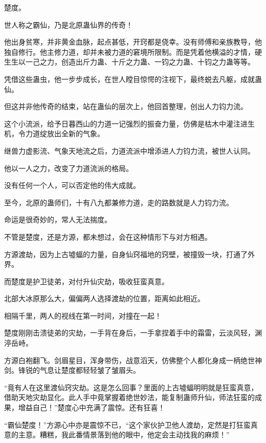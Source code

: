 
\begin{this_body}

楚度。

世人称之霸仙，乃是北原蛊仙界的传奇！

他出身贫寒，并非黄金血脉，起点甚低，开窍都是侥幸。没有师傅和亲族教导，他独自修行。他主修力道，却并未被力道的窘境所限制。而是凭着他横溢的才情，硬生生以一己之力，创造出斤力蛊、十斤之力蛊、一钧之力蛊、十钧之力蛊等等。

凭借这些蛊虫，他一步步成长，在世人瞠目惊愕的注视下，最终蜕去凡躯，成就蛊仙。

但这并非他传奇的结束，站在蛊仙的层次上，他回首整理，创出人力钧力流。

这个小流派，给予日暮西山的力道一记强烈的振奋力量，仿佛是枯木中灌注进生机，令力道绽放出全新的气象。

继兽力虚影流、气象天地流之后，力道流派中增添进人力钧力流，被世人认同。

他以一人之力，改变了力道流派的格局。

没有任何一个人，可以否定他的伟大成就。

至今，北原的蛊师们，十有八九都兼修力道，走的路数就是人力钧力流。

命运是很奇妙的，常人无法揣度。

不管是楚度，还是方源，都未想过，会在这种情形下与对方相遇。

方源渡劫，因为上古墟蝠的力量，自身仙窍福地的窍壁，被撞毁一块，打通了外界。

而楚度是护卫徒弟，对付升仙灾劫，吸收狂蛮真意。

北部大冰原那么大，偏偏两人选择渡劫的位置，距离如此相近。

相隔千里，两人的视线在第一时间，对撞在一起！

楚度刚刚击溃徒弟的灾劫，一手背在身后，一手拿捏着手中的霜雷，云淡风轻，渊渟岳峙。

方源白袍翻飞。剑眉星目，浑身带伤，战意滔天，仿佛整个人都化身成一柄绝世神剑。锋锐的气息让楚度都轻轻皱了皱眉头。

“竟有人在这里渡仙窍灾劫。这是怎么回事？里面的上古墟蝠明明就是狂蛮真意，借助天地灾劫显化。此人手中竟掌握着绝世妙法，能复制蛊师升仙，师法狂蛮的成果，增益自己！”楚度心中充满了震惊。还有狂喜！

“霸仙楚度！”方源心中亦是震惊不已，“这个家伙护卫他人渡劫，定然是打狂蛮真意的主意。糟糕，我此番情景落到他的眼中，他定会主动找我的麻烦！”


\end{this_body}
